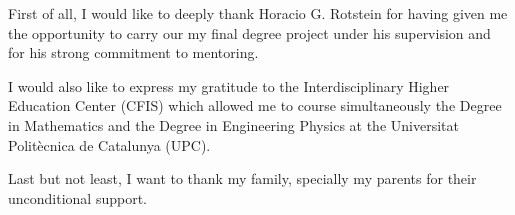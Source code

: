 %
\label{sec:acknowledgement}
First of all, I would like to deeply thank Horacio G. Rotstein for having given me the opportunity to carry our my final degree project under his supervision and for his strong commitment to mentoring.

I would also like to express my gratitude to the Interdisciplinary Higher Education Center (CFIS) which allowed me to course simultaneously the Degree in Mathematics and the Degree in Engineering Physics at the Universitat Politècnica de Catalunya (UPC).

Last but not least, I want to thank my family, specially my parents for their unconditional support. 